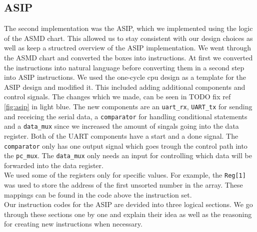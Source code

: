 \documentclass[conference]{IEEEtran}
\begin{document}
\subsection{ASIP}
The second implementation was the ASIP, which we implemented using the logic of the ASMD chart. This allowed us to stay consistent with our design choices as well as keep a structred overview of the ASIP implementation. We went through the ASMD chart and converted the boxes into instructions. At first we converted the instructions into natural language before converting them in a second step into ASIP instructions. We used the one-cycle cpu design as a template for the ASIP design and modified it. This included adding additional components and control signals. The changes which we made, can be seen in TODO fix ref \ref{fig:asip} in light blue. The new components are an \texttt{uart\_rx}, \texttt{UART\_tx} for sending and receicing the serial data, a \texttt{comparator} for handling conditional statements and a \texttt{data\_mux} since we increased the amount of singals going into the data register. Both of the UART components have a start and a done signal. The \texttt{comparator} only has one output signal which goes trough the control path into the \texttt{pc\_mux}. The \texttt{data\_mux} only needs an input for controlling which data will be forwarded into the data register.\\
We used some of the registers only for specific values. For example, the \texttt{Reg[1]} was used to store the address of the first unsorted number in the array. These mappings can be found in the code above the instruction set.\\
Our instruction codes for the ASIP are devided into three logical sections. We go through these sections one by one and explain their idea as well as the reasoning for creating new instructions when necessary.\\
\end{document}
